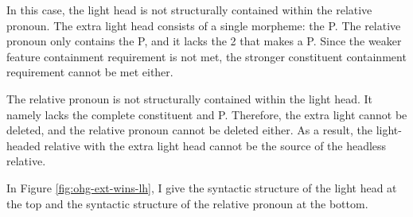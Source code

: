 In this case, the light head is not structurally contained within the relative pronoun.
The extra light head consists of a single morpheme: the P.
The relative pronoun only contains the P, and it lacks the 2 that makes a P. Since the weaker feature containment requirement is not met, the stronger constituent containment requirement cannot be met either.

The relative pronoun is not structurally contained within the light head. It namely lacks the complete constituent and P.
Therefore, the extra light cannot be deleted, and the relative pronoun cannot be deleted either.
As a result, the light-headed relative with the extra light head cannot be the source of the headless relative.

In Figure \ref{fig:ohg-ext-wins-lh}, I give the syntactic structure of the light head at the top and the syntactic structure of the relative pronoun at the bottom.

